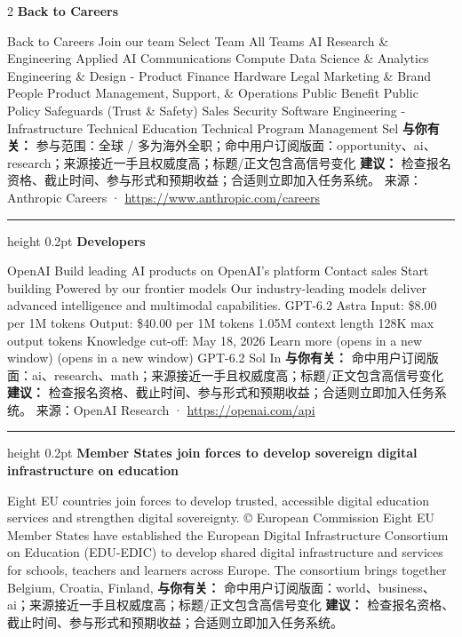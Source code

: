 \documentclass[10.5pt]{ctexart}
\begin{document}
\begin{multicols}{2}
{\large\bfseries Back to Careers}\par
Back to Careers Join our team Select Team All Teams AI Research \& Engineering Applied AI Communications Compute Data Science \& Analytics Engineering \& Design - Product Finance Hardware Legal Marketing \& Brand People Product Management, Support, \& Operations Public Benefit Public Policy Safeguards (Trust \& Safety) Sales Security Software Engineering - Infrastructure Technical Education Technical Program Management Sel
\textbf{与你有关：} 参与范围：全球 / 多为海外全职；命中用户订阅版面：opportunity、ai、research；来源接近一手且权威度高；标题/正文包含高信号变化
\textbf{建议：} 检查报名资格、截止时间、参与形式和预期收益；合适则立即加入任务系统。
{\footnotesize\color{ormuted} 来源：Anthropic Careers · \url{https://www.anthropic.com/careers}}
\vspace{2mm}
\hrule height 0.2pt
\vspace{2mm}
{\large\bfseries Developers}\par
OpenAI Build leading AI products on OpenAI’s platform Contact sales Start building Powered by our frontier models Our industry-leading models deliver advanced intelligence and multimodal capabilities. GPT-6.2 Astra Input: \$8.00 per 1M tokens Output: \$40.00 per 1M tokens 1.05M context length 128K max output tokens Knowledge cut-off: May 18, 2026 Learn more (opens in a new window) (opens in a new window) GPT-6.2 Sol In
\textbf{与你有关：} 命中用户订阅版面：ai、research、math；来源接近一手且权威度高；标题/正文包含高信号变化
\textbf{建议：} 检查报名资格、截止时间、参与形式和预期收益；合适则立即加入任务系统。
{\footnotesize\color{ormuted} 来源：OpenAI Research · \url{https://openai.com/api}}
\vspace{2mm}
\hrule height 0.2pt
\vspace{2mm}
{\large\bfseries Member States join forces to develop sovereign digital infrastructure on education}\par
Eight EU countries join forces to develop trusted, accessible digital education services and strengthen digital sovereignty. © European Commission Eight EU Member States have established the European Digital Infrastructure Consortium on Education (EDU-EDIC) to develop shared digital infrastructure and services for schools, teachers and learners across Europe. The consortium brings together Belgium, Croatia, Finland, 
\textbf{与你有关：} 命中用户订阅版面：world、business、ai；来源接近一手且权威度高；标题/正文包含高信号变化
\textbf{建议：} 检查报名资格、截止时间、参与形式和预期收益；合适则立即加入任务系统。

\end{multicols}
\end{document}

